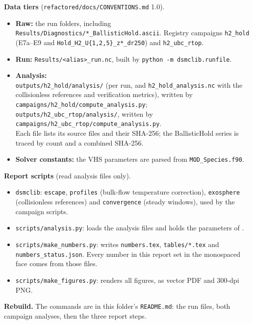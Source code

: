 \documentclass[10pt]{article}
\newcommand{\para}[1]{\textbf{#1}\hspace{0.5em}}
\begin{document}
\para{Data tiers} (\texttt{refactored/docs/CONVENTIONS.md} 1.0).
\begin{itemize}
  \item \textbf{Raw:} the run folders, including \texttt{Results/Diagnostics/*\_BallisticHold.ascii}. Registry campaigns \texttt{h2\_hold} (E7a–E9 and \texttt{Hold\_H2\_U\{1,2,5\}\_z*\_dr250}) and \texttt{h2\_ubc\_rtop}.
  \item \textbf{Run:} \texttt{Results/<alias>\_run.nc}, built by \texttt{python -m dsmclib.runfile}.
  \item \textbf{Analysis:}\\ \texttt{outputs/h2\_hold/analysis/} (per run, and \texttt{h2\_hold\_analysis.nc} with the collisionless references and verification metrics), written by\\ \texttt{campaigns/h2\_hold/compute\_analysis.py};\\ \texttt{outputs/h2\_ubc\_rtop/analysis/}, written by\\ \texttt{campaigns/h2\_ubc\_rtop/compute\_analysis.py}.\\ Each file lists its source files and their SHA-256; the BallisticHold series is traced by count and a combined SHA-256.
  \item \textbf{Solver constants:} the VHS parameters are parsed from \texttt{MOD\_Species.f90}.
\end{itemize}

\para{Report scripts} (read analysis files only).
\begin{itemize}
  \item \texttt{dsmclib}: \texttt{escape}, \texttt{profiles} (bulk-flow temperature correction), \texttt{exosphere} (collisionless references) and \texttt{convergence} (steady windows), used by the campaign scripts.
  \item \texttt{scripts/analysis.py}: loads the analysis files and holds the parameters of \citet{cm21}.
  \item \texttt{scripts/make\_numbers.py}: writes \texttt{numbers.tex}, \texttt{tables/*.tex} and \texttt{numbers\_status.json}. Every number in this report set in the monospaced face comes from those files.
  \item \texttt{scripts/make\_figures.py}: renders all figures, as vector PDF and 300-dpi PNG.
\end{itemize}

\para{Rebuild.} The commands are in this folder's \texttt{README.md}: the run files, both campaign analyses, then the three report steps.
\end{document}
